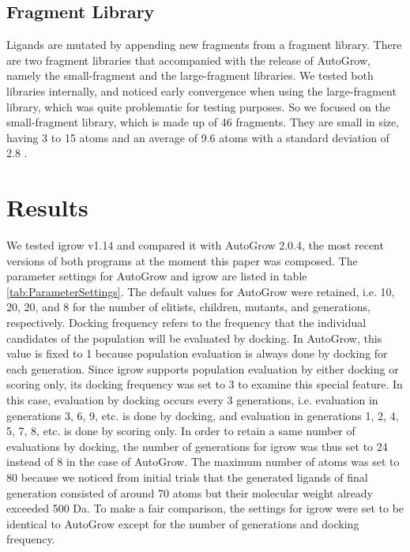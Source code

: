 \documentclass[10pt,conference,letterpaper]{IEEEtran}
\begin{document}
\subsection{Fragment Library}
Ligands are mutated by appending new fragments from a fragment library.
There are two fragment libraries that accompanied with the release of AutoGrow, namely the small-fragment and the large-fragment libraries.
We tested both libraries internally, and noticed early convergence when using the large-fragment library, which was quite problematic for testing purposes.
So we focused on the small-fragment library, which is made up of 46 fragments.
They are small in size, having 3 to 15 atoms and an average of 9.6 atoms with a standard deviation of 2.8 \cite{114}.

\section{Results}\label{sec:results}
We tested igrow v1.14 and compared it with AutoGrow 2.0.4, the most recent versions of both programs at the moment this paper was composed.
The parameter settings for AutoGrow and igrow are listed in table \ref{tab:ParameterSettings}.
The default values for AutoGrow were retained, i.e. 10, 20, 20, and 8 for the number of elitists, children, mutants, and generations, respectively.
Docking frequency refers to the frequency that the individual candidates of the population will be evaluated by docking. In AutoGrow, this value is fixed to 1 because population evaluation is always done by docking for each generation. Since igrow supports population evaluation by either docking or scoring only, its docking frequency was set to 3 to examine this special feature. In this case, evaluation by docking occurs every 3 generations, i.e. evaluation in generations 3, 6, 9, etc. is done by docking, and evaluation in generations 1, 2, 4, 5, 7, 8, etc. is done by scoring only. In order to retain a same number of evaluations by docking, the number of generations for igrow was thus set to 24 instead of 8 in the case of AutoGrow.
The maximum number of atoms was set to 80 because we noticed from initial trials that the generated ligands of final generation consisted of around 70 atoms but their molecular weight already exceeded 500 Da.
To make a fair comparison, the settings for igrow were set to be identical to AutoGrow except for the number of generations and docking frequency.
\end{document}

